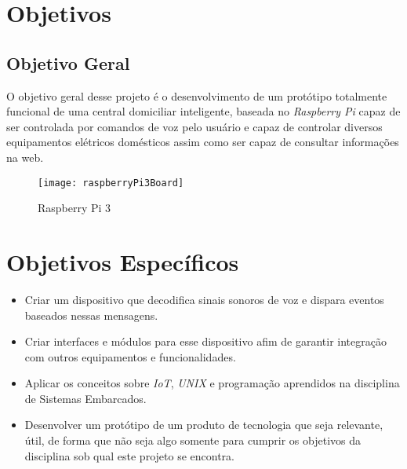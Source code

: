 \section{Objetivos}

\subsection{Objetivo Geral}
	O objetivo geral desse projeto é o desenvolvimento de um protótipo totalmente funcional de uma central domiciliar inteligente, baseada no \textit{Raspberry Pi} \cite{magpi} capaz de ser controlada por comandos de voz pelo usuário e capaz de controlar diversos equipamentos elétricos domésticos assim como ser capaz de consultar informações na web.

\begin{figure}[htbp]
	\centering
		\texttt{[image: raspberryPi3Board]}
	\caption{Raspberry Pi 3 \cite{pi3}}
	\label{fig-raspberrypi3}
\end{figure}

\section{Objetivos Específicos}
  \begin{itemize}
    \item Criar um dispositivo que decodifica sinais sonoros de voz e dispara eventos baseados nessas mensagens.
    \item Criar interfaces e módulos para esse dispositivo afim de garantir integração com outros equipamentos e funcionalidades.
    \item Aplicar os conceitos sobre \textit{IoT}, \textit{UNIX} e programação aprendidos na disciplina de Sistemas Embarcados.
    \item Desenvolver um protótipo de um produto de tecnologia que seja relevante, útil, de forma que não seja algo somente para cumprir os objetivos da disciplina sob qual este projeto se encontra.
  \end{itemize}
